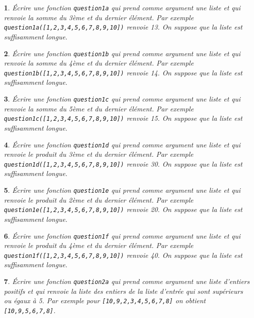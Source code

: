 \documentclass[10pt]{article}
\newtheorem{exi}{}
\newenvironment{exo}{\begin{exi}\em}{\end{exi}}
\begin{document}
\begin{exo}
    Écrire une fonction {\tt question1a} qui prend comme argument une liste et
qui renvoie la somme du 3ème et du dernier élément. Par exemple
\verb+question1a([1,2,3,4,5,6,7,8,9,10])+ renvoie 13.
On suppose que la liste est suffisamment longue.
\end{exo}
\vspace*{-2ex}
\begin{exo}
    Écrire une fonction {\tt question1b} qui prend comme argument une liste et
qui renvoie la somme du 4ème et du dernier élément. Par exemple
\verb+question1b([1,2,3,4,5,6,7,8,9,10])+ renvoie 14.
On suppose que la liste est suffisamment longue.
\end{exo}
\vspace*{-2ex}
\begin{exo}
    Écrire une fonction {\tt question1c} qui prend comme argument une liste et
qui renvoie la somme du 5ème et du dernier élément. Par exemple
\verb+question1c([1,2,3,4,5,6,7,8,9,10])+ renvoie 15.
On suppose que la liste est suffisamment longue.
\end{exo}
\vspace*{-2ex}
\begin{exo}
    Écrire une fonction {\tt question1d} qui prend comme argument une liste et
qui renvoie le produit du 3ème et du dernier élément. Par exemple
\verb+question1d([1,2,3,4,5,6,7,8,9,10])+ renvoie 30.
On suppose que la liste est suffisamment longue.
\end{exo}
\vspace*{-2ex}
\begin{exo}
    Écrire une fonction {\tt question1e} qui prend comme argument une liste et
qui renvoie le produit du 2ème et du dernier élément. Par exemple
\verb+question1e([1,2,3,4,5,6,7,8,9,10])+ renvoie 20.
On suppose que la liste est suffisamment longue.
\end{exo}
\vspace*{-2ex}
\begin{exo}
    Écrire une fonction {\tt question1f} qui prend comme argument une liste et
qui renvoie le produit du 4ème et du dernier élément. Par exemple
\verb+question1f([1,2,3,4,5,6,7,8,9,10])+ renvoie 40.
On suppose que la liste est suffisamment longue.
\end{exo}
\vspace*{-2ex}
\begin{exo}
    Écrire une fonction {\tt question2a} qui prend comme argument une liste d'entiers positifs et qui renvoie la liste des entiers de la liste d'entrée qui sont
supérieurs ou égaux à 5. Par exemple pour \verb+[10,9,2,3,4,5,6,7,8]+
on obtient \verb+[10,9,5,6,7,8]+.
\end{exo}
\end{document}
